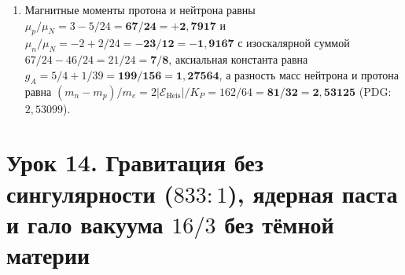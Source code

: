 \begin{enumerate}[label=\textbf{\arabic*.},noitemsep]
\begin{equation}
    \label{eq:course-alpha-fs}
    \alpha_{\mathrm{fs}}^{-1}(3)
    \;=\; \frac{A_{\mathrm{den}}(3) + B_{\mathrm{den}}(3)\sqrt{2}}{A_{\mathrm{num}}(3) + B_{\mathrm{num}}(3)\sqrt{2}}
    \;=\; \frac{17\,351\,739\,044 - 679\sqrt{2}}{131\,726 + 89\,441\,954\sqrt{2}}
    \;=\; \mathbf{137{,}035999187\dots}
  \end{equation}
  которая попадает в эксперимент CODATA-2022 ($137{,}035999177(21)$) с точностью $\mathbf{0{,}47\sigma}$ без единого подгоночного параметра!
\item Магнитные моменты протона и нейтрона равны $\mu_p/\mu_N = 3 - 5/24 = \mathbf{67/24 = +2{,}7917}$ и $\mu_n/\mu_N = -2 + 2/24 = \mathbf{-23/12 = -1{,}9167}$ с изоскалярной суммой $67/24 - 46/24 = 21/24 = \mathbf{7/8}$, аксиальная константа равна $g_A = 5/4 + 1/39 = \mathbf{199/156 = 1{,}27564}$, а разность масс нейтрона и протона равна $(m_n - m_p)/m_e = 2|\mathcal{E}_{\mathrm{Heis}}| / K_P = 162 / 64 = \mathbf{81/32 = 2{,}53125}$ (PDG: $2{,}53099$).
\end{enumerate}

\section{Урок 14. Гравитация без сингулярности (\texorpdfstring{$833:1$}{833:1}), ядерная паста и гало вакуума \texorpdfstring{$16/3$}{16/3} без тёмной материи}

